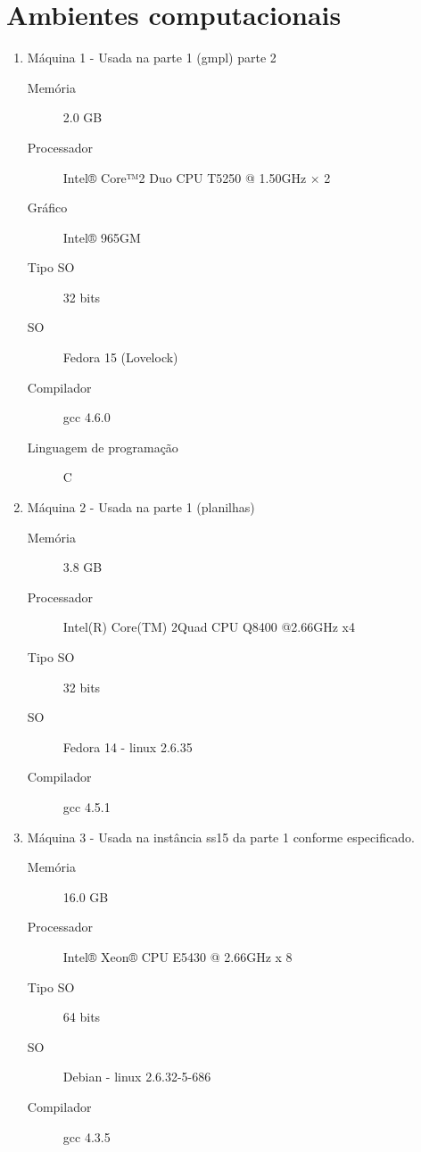 \documentclass[11pt,letterpaper]{article}
\begin{document}
\section{Ambientes computacionais}
\begin{enumerate}
\item Máquina 1 - Usada na parte 1 (gmpl) parte 2

  \begin{description}
  \item[Memória]2.0 GB
  \item[Processador]  Intel® Core™2 Duo CPU T5250 @ 1.50GHz × 2
  \item[Gráfico] Intel® 965GM   
  \item[Tipo SO] 32 bits   
  \item[SO] Fedora 15 (Lovelock)   
  \item[Compilador] gcc 4.6.0 
  \item[Linguagem de programação] C
  \end{description}

\item Máquina 2 - Usada na parte 1 (planilhas)

  \begin{description}
  \item[Memória]3.8 GB
  \item[Processador]   Intel(R) Core(TM) 2Quad CPU  Q8400 @2.66GHz x4
  \item[Tipo SO] 32 bits   
  \item[SO] Fedora 14 - linux 2.6.35 
  \item[Compilador] gcc 4.5.1 

  \end{description}


\item Máquina 3 - Usada na instância ss15 da parte 1 conforme especificado. 

  \begin{description}
  \item[Memória]16.0 GB
  \item[Processador] Intel® Xeon® CPU E5430  @ 2.66GHz x 8  
  \item[Tipo SO] 64 bits   
  \item[SO] Debian - linux 2.6.32-5-686 
  \item[Compilador] gcc 4.3.5 
  \end{description}

\end{enumerate}

% 
%   
\end{document}
